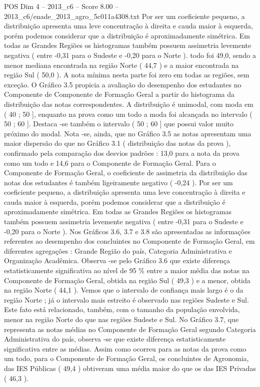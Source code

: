 \begin{textsample}{POS Dim 4 – 2013\_c6 – Score 8.00 – 2013\_c6/enade\_2013\_agro\_5c011a4308.txt}
Por ser um coeficiente pequeno, a distribuição apresenta uma leve concentração à direita e cauda maior à esquerda, porém podemos considerar que a distribuição é aproximadamente simétrica.
Em todas as Grandes Regiões os histogramas também possuem assimetria levemente negativa ( entre -0,31 para o Sudeste e -0,20 para o Norte ). todo foi 49,0, sendo a menor mediana encontrada na região Norte ( 44,7 ) e a maior encontrada na região Sul ( 50,0 ).
A nota mínima nesta parte foi zero em todas as regiões, sem exceção.
O Gráfico 3.5 propicia a avaliação do desempenho dos estudantes no Componente de Componente de Formação Geral a partir do histograma da distribuição das notas correspondentes.
A distribuição é unimodal, com moda em ( 40 ; 50 ], enquanto na prova como um todo a moda foi alcançada no intervalo ( 50 ; 60 ].
Destaca -se também o intervalo ( 50 ; 60 ] que possui valor muito próximo do modal.
Nota -se, ainda, que no Gráfico 3.5 as notas apresentam uma maior dispersão do que no Gráfico 3.1 ( distribuição das notas da prova ), confirmado pela comparação dos desvios padrões : 13,0 para a nota da prova como um todo e 14,6 para o Componente de Formação Geral.
Para o Componente de Formação Geral, o coeficiente de assimetria da distribuição das notas dos estudantes é também ligeiramente negativo ( -0,24 ).
Por ser um coeficiente pequeno, a distribuição apresenta uma leve concentração à direita e cauda maior à esquerda, porém podemos considerar que a distribuição é aproximadamente simétrica.
Em todas as Grandes Regiões os histogramas também possuem assimetria levemente negativa ( entre -0,31 para o Sudeste e -0,20 para o Norte ).
Nos Gráficos 3.6, 3.7 e 3.8 são apresentadas as informações referentes ao desempenho dos concluintes no Componente de Formação Geral, em diferentes agregações : Grande Região do país, Categoria Administrativa e Organização Acadêmica.
Observa -se pelo Gráfico 3.6 que existe diferença estatisticamente significativa ao nível de 95 \% entre a maior média das notas na Componente de Formação Geral, obtida na região Sul ( 49,3 ) e a menor, obtida na região Norte ( 44,1 ).
Vemos que o intervalo de confiança mais largo é o da região Norte ; já o intervalo mais estreito é observado nas regiões Sudeste e Sul.
Este fato está relacionado, também, com o tamanho da população envolvida, menor na região Norte do que nas regiões Sudeste e Sul.
No Gráfico 3.7, que representa as notas médias no Componente de Formação Geral segundo Categoria Administrativa do país, observa -se que existe diferença estatisticamente significativa entre as médias.
Assim como ocorreu para as notas da prova como um todo, para o Componente de Formação Geral, os concluintes de Agronomia, das IES Públicas ( 49,4 ) obtiveram uma média maior do que os das IES Privadas ( 46,3 ).

\end{textsample}
